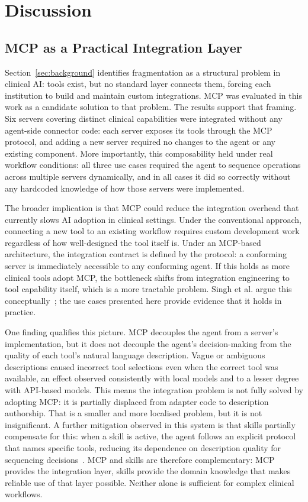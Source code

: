\documentclass[conference]{IEEEtran}
\begin{document}
\section{Discussion}

\subsection{MCP as a Practical Integration Layer}

Section~\ref{sec:background} identifies fragmentation as a structural problem in clinical AI: tools exist, but no standard layer connects them, forcing each institution to build and maintain custom integrations. MCP was evaluated in this work as a candidate solution to that problem. The results support that framing. Six servers covering distinct clinical capabilities were integrated without any agent-side connector code: each server exposes its tools through the MCP protocol, and adding a new server required no changes to the agent or any existing component. More importantly, this composability held under real workflow conditions: all three use cases required the agent to sequence operations across multiple servers dynamically, and in all cases it did so correctly without any hardcoded knowledge of how those servers were implemented.

The broader implication is that MCP could reduce the integration overhead that currently slows AI adoption in clinical settings. Under the conventional approach, connecting a new tool to an existing workflow requires custom development work regardless of how well-designed the tool itself is. Under an MCP-based architecture, the integration contract is defined by the protocol: a conforming server is immediately accessible to any conforming agent. If this holds as more clinical tools adopt MCP, the bottleneck shifts from integration engineering to tool capability itself, which is a more tractable problem. Singh et al. argue this conceptually~\cite{mcp-aditi}; the use cases presented here provide evidence that it holds in practice.

One finding qualifies this picture. MCP decouples the agent from a server's implementation, but it does not decouple the agent's decision-making from the quality of each tool's natural language description. Vague or ambiguous descriptions caused incorrect tool selections even when the correct tool was available, an effect observed consistently with local models and to a lesser degree with API-based models. This means the integration problem is not fully solved by adopting MCP: it is partially displaced from adapter code to description authorship.
That is a smaller and more localised problem, but it is not insignificant. A further mitigation observed in this system is that skills partially compensate for this: when a skill is active, the agent follows an explicit protocol that names specific tools, reducing its dependence on description quality for sequencing decisions~\cite{agentskillslargelanguage}. MCP and skills are therefore complementary: MCP provides the integration layer, skills provide the domain knowledge that makes reliable use of that layer possible. Neither alone is sufficient for complex clinical workflows.
\end{document}
